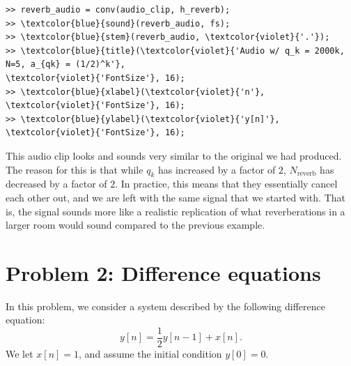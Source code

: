 \documentclass[12pt]{article}
\begin{document}
\begin{enumerate}[label=\textbf{\alph*)}, leftmargin=2.6em]
\begin{Verbatim}[frame=single, commandchars=\\\{\}]
>> reverb_audio = conv(audio_clip, h_reverb);
>> \textcolor{blue}{sound}(reverb_audio, fs);
>> \textcolor{blue}{stem}(reverb_audio, \textcolor{violet}{'.'});
>> \textcolor{blue}{title}(\textcolor{violet}{'Audio w/ q_k = 2000k, N=5, a_{qk} = (1/2)^k'}, 
\textcolor{violet}{'FontSize'}, 16);
>> \textcolor{blue}{xlabel}(\textcolor{violet}{'n'}, \textcolor{violet}{'FontSize'}, 16);
>> \textcolor{blue}{ylabel}(\textcolor{violet}{'y[n]'}, \textcolor{violet}{'FontSize'}, 16);
\end{Verbatim}
This audio clip looks and sounds very similar to the original we had produced. The reason for this is that while $q_k$ has increased by a factor of $2$, $N_\text{reverb}$ has decreased by a factor of $2$. In practice, this means that they essentially cancel each other out, and we are left with the same signal that we started with. That is, the signal sounds more like a realistic replication of what reverberations in a larger room would sound compared to the previous example.
\end{enumerate}


\section*{Problem 2: Difference equations}
In this problem, we consider a system described by the following difference equation:
\begin{equation}
    y[n] = \frac{1}{2} y[n-1] + x[n].
\end{equation}
We let $x[n]=1$, and assume the initial condition $y[0]=0$.
\end{document}
